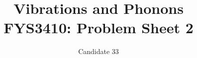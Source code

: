 \documentclass[11pt]{amsart}
\title[Vibrations and Phonons]{Vibrations and Phonons \\
		\hrulefill \small{ FYS3410: Problem Sheet 2 } \hrulefill}
\author{Candidate 33}
\begin{document}
\maketitle

\end{document}
